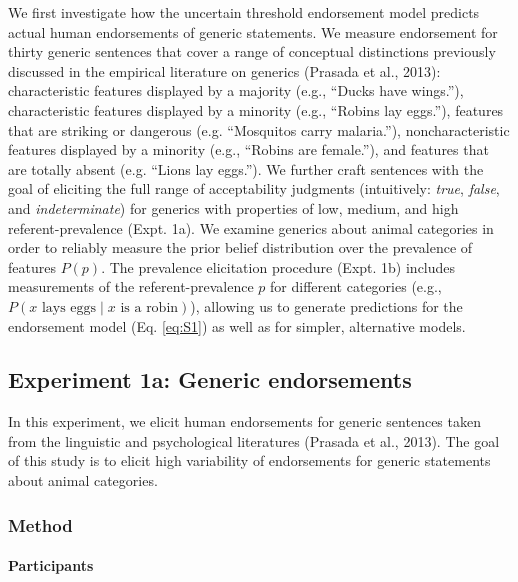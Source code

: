 \documentclass[english,,man,floatsintext]{apa6}
\let\oldparagraph\paragraph
\renewcommand{\paragraph}[1]{\oldparagraph{#1}\mbox{}}
\theoremstyle{definition}
\theoremstyle{definition}
\theoremstyle{definition}
\theoremstyle{remark}
\begin{document}
We first investigate how the uncertain threshold endorsement model
predicts actual human endorsements of generic statements. We measure
endorsement for thirty generic sentences that cover a range of
conceptual distinctions previously discussed in the empirical literature
on generics (Prasada et al., 2013): characteristic features displayed by
a majority (e.g., \enquote{Ducks have wings.}), characteristic features
displayed by a minority (e.g., \enquote{Robins lay eggs.}), features
that are striking or dangerous (e.g. \enquote{Mosquitos carry
malaria.}), noncharacteristic features displayed by a minority (e.g.,
\enquote{Robins are female.}), and features that are totally absent
(e.g. \enquote{Lions lay eggs.}). We further craft sentences with the
goal of eliciting the full range of acceptability judgments
(intuitively: \emph{true}, \emph{false}, and \emph{indeterminate}) for
generics with properties of low, medium, and high referent-prevalence
(Expt. 1a). We examine generics about animal categories in order to
reliably measure the prior belief distribution over the prevalence of
features \(P(p)\). The prevalence elicitation procedure (Expt. 1b)
includes measurements of the referent-prevalence \(p\) for different
categories (e.g., \(P(x \text{ lays eggs} \mid x \text{ is a robin})\)),
allowing us to generate predictions for the endorsement model (Eq.
\ref{eq:S1}) as well as for simpler, alternative models.

\hypertarget{experiment-1a-generic-endorsements}{%
\subsection{Experiment 1a: Generic
endorsements}\label{experiment-1a-generic-endorsements}}

In this experiment, we elicit human endorsements for generic sentences
taken from the linguistic and psychological literatures (Prasada et al.,
2013). The goal of this study is to elicit high variability of
endorsements for generic statements about animal categories.

\hypertarget{method}{%
\subsubsection{Method}\label{method}}

\hypertarget{participants}{%
\paragraph{Participants}\label{participants}}
\end{document}

